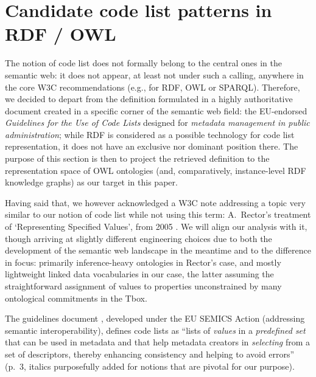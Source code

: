 \section{Candidate code list patterns in RDF / OWL}
\label{s:codelist-def}

The notion of code list does not formally belong to the central ones in the semantic web: it does not appear, at least not under such a calling, anywhere in the core W3C recommendations (e.g., for RDF, OWL or SPARQL). 
Therefore, we decided to depart from the definition formulated in a highly authoritative document created in a specific corner of the semantic web field: the EU-endorsed \emph{Guidelines for the Use of Code Lists} \cite{guide_code_list} designed for  \emph{metadata management in public administration}; while RDF is considered as a possible technology for code list representation, it does not have an exclusive nor dominant position there. 
The purpose of this section is then to project the retrieved definition to the representation space of OWL ontologies (and, comparatively, instance-level RDF knowledge graphs) as our target in this paper.

Having said that, we however acknowledged a W3C note addressing a topic very similar to our notion of code list while not using this term: A.~Rector's treatment of `Representing Specified Values', from 2005 \cite{alanrector}. 
We will align our analysis with it, though arriving at slightly different engineering choices due to both the development of the semantic web landscape in the meantime and to the difference in focus: primarily inference-heavy ontologies in Rector's case, and mostly lightweight linked data vocabularies in our case, the latter assuming the straightforward assignment of values to properties unconstrained by many ontological commitments in the Tbox.

The guidelines document \cite{guide_code_list}, developed under the EU SEMICS Action (addressing semantic interoperability), defines code lists as ``lists of \emph{values} in a \emph{predefined set} that can be used in metadata and that help metadata creators in \emph{selecting} from a set of descriptors, thereby enhancing consistency and helping to avoid errors'' (p.~3, italics purposefully added for notions that are pivotal for our purpose). 


